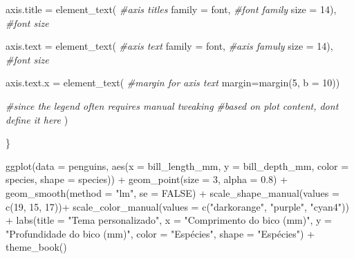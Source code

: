 \documentclass[
]{book}
\newenvironment{Shaded}{\begin{snugshade}}{\end{snugshade}}
\newcommand{\AttributeTok}[1]{\textcolor[rgb]{0.61,0.61,0.61}{#1}}
\newcommand{\CommentTok}[1]{\textcolor[rgb]{0.37,0.37,0.37}{\textit{#1}}}
\newcommand{\ConstantTok}[1]{\textcolor[rgb]{0,0,0}{#1}}
\newcommand{\DecValTok}[1]{\textcolor[rgb]{0.06,0.06,0.06}{#1}}
\newcommand{\FloatTok}[1]{\textcolor[rgb]{0.06,0.06,0.06}{#1}}
\newcommand{\FunctionTok}[1]{\textcolor[rgb]{0,0,0}{#1}}
\newcommand{\NormalTok}[1]{#1}
\newcommand{\SpecialCharTok}[1]{\textcolor[rgb]{0,0,0}{#1}}
\newcommand{\StringTok}[1]{\textcolor[rgb]{0.5,0.5,0.5}{#1}}
\begin{document}
\begin{Shaded}
\begin{Highlighting}[]
  \AttributeTok{axis.title =} \FunctionTok{element\_text}\NormalTok{(             }\CommentTok{\#axis titles}
    \AttributeTok{family =}\NormalTok{ font,            }\CommentTok{\#font family}
    \AttributeTok{size =} \DecValTok{14}\NormalTok{),               }\CommentTok{\#font size}
  
  \AttributeTok{axis.text =} \FunctionTok{element\_text}\NormalTok{(              }\CommentTok{\#axis text}
    \AttributeTok{family =}\NormalTok{ font,            }\CommentTok{\#axis famuly}
    \AttributeTok{size =} \DecValTok{14}\NormalTok{),                }\CommentTok{\#font size}
  
  \AttributeTok{axis.text.x =} \FunctionTok{element\_text}\NormalTok{(            }\CommentTok{\#margin for axis text}
    \AttributeTok{margin=}\FunctionTok{margin}\NormalTok{(}\DecValTok{5}\NormalTok{, }\AttributeTok{b =} \DecValTok{10}\NormalTok{))}
  
  \CommentTok{\#since the legend often requires manual tweaking }
  \CommentTok{\#based on plot content, don\textquotesingle{}t define it here}
\NormalTok{)}

\NormalTok{\}}


\FunctionTok{ggplot}\NormalTok{(}\AttributeTok{data =}\NormalTok{ penguins, }
       \FunctionTok{aes}\NormalTok{(}\AttributeTok{x =}\NormalTok{ bill\_length\_mm, }
           \AttributeTok{y =}\NormalTok{ bill\_depth\_mm,}
           \AttributeTok{color =}\NormalTok{ species,}
           \AttributeTok{shape =}\NormalTok{ species)) }\SpecialCharTok{+}
  \FunctionTok{geom\_point}\NormalTok{(}\AttributeTok{size =} \DecValTok{3}\NormalTok{, }
             \AttributeTok{alpha =} \FloatTok{0.8}\NormalTok{) }\SpecialCharTok{+}
  \FunctionTok{geom\_smooth}\NormalTok{(}\AttributeTok{method =} \StringTok{"lm"}\NormalTok{, }\AttributeTok{se =} \ConstantTok{FALSE}\NormalTok{) }\SpecialCharTok{+}
  \FunctionTok{scale\_shape\_manual}\NormalTok{(}\AttributeTok{values =} \FunctionTok{c}\NormalTok{(}\DecValTok{19}\NormalTok{, }\DecValTok{15}\NormalTok{, }\DecValTok{17}\NormalTok{))}\SpecialCharTok{+}
  \FunctionTok{scale\_color\_manual}\NormalTok{(}\AttributeTok{values =} \FunctionTok{c}\NormalTok{(}\StringTok{"darkorange"}\NormalTok{, }\StringTok{"purple"}\NormalTok{, }\StringTok{"cyan4"}\NormalTok{)) }\SpecialCharTok{+}
  \FunctionTok{labs}\NormalTok{(}\AttributeTok{title =} \StringTok{"Tema personalizado"}\NormalTok{, }\AttributeTok{x =} \StringTok{"Comprimento do bico (mm)"}\NormalTok{, }\AttributeTok{y =} \StringTok{"Profundidade do bico (mm)"}\NormalTok{, }
       \AttributeTok{color =} \StringTok{"Espécies"}\NormalTok{, }\AttributeTok{shape =} \StringTok{"Espécies"}\NormalTok{) }\SpecialCharTok{+}
  \FunctionTok{theme\_book}\NormalTok{()}
\end{Highlighting}
\end{Shaded}
\end{document}

